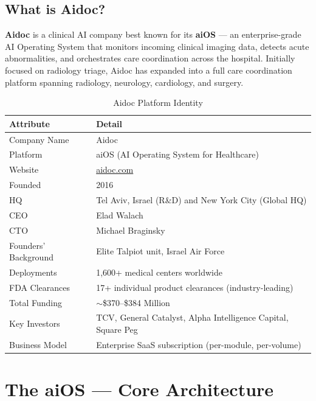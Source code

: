 \documentclass[12pt,a4paper]{article}
\begin{document}
\subsection{What is Aidoc?}
\textbf{Aidoc} is a clinical AI company best known for its \textbf{aiOS\texttrademark} --- an enterprise-grade AI Operating System that monitors incoming clinical imaging data, detects acute abnormalities, and orchestrates care coordination across the hospital. Initially focused on radiology triage, Aidoc has expanded into a full care coordination platform spanning radiology, neurology, cardiology, and surgery.

\begin{table}[H]\centering\renewcommand{\arraystretch}{1.4}
\begin{tabularx}{\textwidth}{lX}\toprule
\textbf{Attribute} & \textbf{Detail}\\\midrule
Company Name     & Aidoc \\
Platform         & aiOS\texttrademark{} (AI Operating System for Healthcare) \\
Website          & \href{https://aidoc.com}{aidoc.com} \\
Founded          & 2016 \\
HQ               & Tel Aviv, Israel (R\&D) and New York City (Global HQ) \\
CEO              & Elad Walach \\
CTO              & Michael Braginsky \\
Founders' Background & Elite Talpiot unit, Israel Air Force \\
Deployments      & 1,600+ medical centers worldwide \\
FDA Clearances   & 17+ individual product clearances (industry-leading) \\
Total Funding    & $\sim$\$370--\$384 Million \\
Key Investors    & TCV, General Catalyst, Alpha Intelligence Capital, Square Peg \\
Business Model   & Enterprise SaaS subscription (per-module, per-volume) \\
\bottomrule\end{tabularx}\caption{Aidoc Platform Identity}\end{table}

\section{The aiOS --- Core Architecture}
\end{document}

